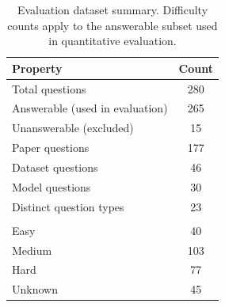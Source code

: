 \begin{table}[ht]
  \centering
  \footnotesize
  \caption{Evaluation dataset summary. Difficulty counts apply to the answerable subset used in quantitative evaluation.}
  \label{tab:evaluation_dataset_summary}
  \begin{tabular}{lc}
    \toprule
    \textbf{Property} & \textbf{Count} \\
    \midrule
    Total questions & 280 \\
    Answerable (used in evaluation) & 265 \\
    Unanswerable (excluded) & 15 \\
    \addlinespace
    Paper questions & 177 \\
    Dataset questions & 46 \\
    Model questions & 30 \\
    \addlinespace
    Distinct question types & 23 \\
    \addlinespace
    \multicolumn{2}{l}{\textit{Difficulty (answerable questions)}} \\
    \quad Easy & 40 \\
    \quad Medium & 103 \\
    \quad Hard & 77 \\
    \quad Unknown & 45 \\
    \bottomrule
  \end{tabular}
\end{table}